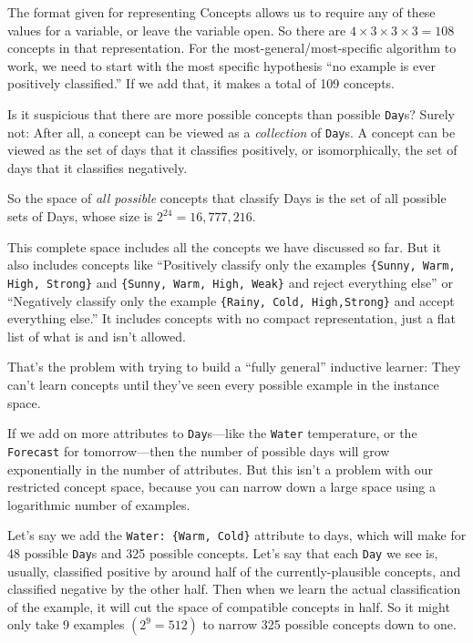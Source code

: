 { The format given for representing Concepts allows us to require
any of these values for a variable, or leave the variable open. So
there are $4 \times 3 \times 3 \times 3 = 108$ concepts
in that representation. For the most-general/most-specific algorithm to
work, we need to start with the most specific hypothesis
``no example is ever positively
classified.'' If we add that, it makes a total of 109
concepts.


 Is it suspicious that there are more possible concepts than
possible \texttt{Day}s? Surely not: After all, a concept can be viewed as a
\textit{collection} of \texttt{Day}s. A concept can be viewed as the set of days
that it classifies positively, or isomorphically, the set of days that
it classifies negatively.


 So the space of \textit{all possible} concepts that classify Days
is the set of all possible sets of Days, whose size is
$2^{24} = 16,777,216$.


 This complete space includes all the concepts we have discussed so
far. But it also includes concepts like ``Positively
classify only the examples \texttt{\{Sunny, Warm, High, Strong\}} and
\texttt{\{Sunny, Warm, High, Weak\}} and reject everything
else'' or ``Negatively classify only
the example \texttt{\{Rainy, Cold, High,Strong\}} and accept everything
else.'' It includes concepts with no compact
representation, just a flat list of what is and isn't
allowed.


 That's the problem with trying to build a
``fully general'' inductive learner:
They can't learn concepts until they've
seen every possible example in the instance space.


 If we add on more attributes to \texttt{Day}s---like the \texttt{Water} temperature,
or the \texttt{Forecast} for tomorrow---then the number of possible days will
grow exponentially in the number of attributes. But this
isn't a problem with our restricted concept space,
because you can narrow down a large space using a logarithmic number of
examples.


  Let's say we add the \texttt{Water: \{Warm, Cold\}}
  attribute to days, which will
make for 48 possible \texttt{Day}s and 325 possible concepts.
Let's say that each \texttt{Day} we see is, usually, classified
positive by around half of the currently-plausible concepts, and
classified negative by the other half. Then when we learn the actual
classification of the example, it will cut the space of compatible
concepts in half. So it might only take 9 examples
$(2^9 = 512)$ to narrow 325 possible concepts down to
one.


}
